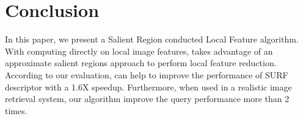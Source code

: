 \section{Conclusion}
\label{sec:conclusion}

In this paper, we present a Salient Region conducted Local Feature algorithm. With computing directly on local image features, {\sys} takes advantage of an approximate salient regions approach to perform local feature reduction. According to our evaluation, {\sys} can help to improve the performance of SURF descriptor with a 1.6X speedup. Furthermore, when used in a realistic image retrieval system, our algorithm improve the query performance more than 2 times. 